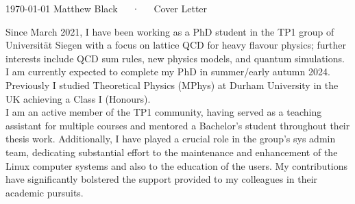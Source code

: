 \documentclass[11pt, a4paper]{awesome-cv}
\newcommand\uni{Trinity College}
\newcommand{\red}{\color{red}}
\begin{document}
\makecvheader[R]

\makecvfooter
  {\today}
  {Matthew Black~~~·~~~Cover Letter}
  {}

\vspace{-30pt}
\makelettertitle

\begin{cvletter}

Since March 2021, I have been working as a PhD student in the TP1 group of Universit\"at Siegen with a focus on lattice QCD for heavy flavour physics; further interests include QCD sum rules, new physics models, and quantum simulations.
I am currently expected to complete my PhD in summer/early autumn 2024.
Previously I studied Theoretical Physics (MPhys) at Durham University in the UK achieving a Class I (Honours).
\\
I am an active member of the TP1 community, having served as a teaching assistant for multiple courses and mentored a Bachelor's student throughout their thesis work. 
Additionally, I have played a crucial role in the group's sys admin team, dedicating substantial effort to the maintenance and enhancement of the Linux computer systems and also to the education of the users. 
My contributions have significantly bolstered the support provided to my colleagues in their academic pursuits.

%


\end{cvletter}
\end{document}
